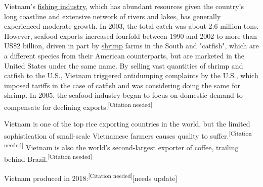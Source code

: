 \documentclass{article}
\begin{document}
Vietnam's \href{https://en.wikipedia.org/wiki/Fishing}{fishing industry}, which has abundant resources given the country's long coastline and extensive network of rivers and lakes, has generally experienced moderate growth. In 2003, the total catch was about 2.6 million tons. However, seafood exports increased fourfold between 1990 and 2002 to more than US\$2 billion, driven in part by \href{https://en.wikipedia.org/wiki/Shrimp}{shrimp} farms in the South and "catfish", which are a different species from their American counterparts, but are marketed in the United States under the same name. By selling vast quantities of shrimp and catfish to the U.S., Vietnam triggered antidumping complaints by the U.S., which imposed tariffs in the case of catfish and was considering doing the same for shrimp. In 2005, the seafood industry began to focus on domestic demand to compensate for declining exports.\textsuperscript{[Citation needed]}

Vietnam is one of the top rice exporting countries in the world, but the limited sophistication of small-scale Vietnamese farmers causes quality to suff\-er.\textsuperscript{[Citation needed]} Vietnam is also the world's second-largest exporter of coffee, trailing behind Brazil.\textsuperscript{[Citation needed]}

Vietnam produced in 2018:\textsuperscript{[Citation needed]}[needs update]
\end{document}
